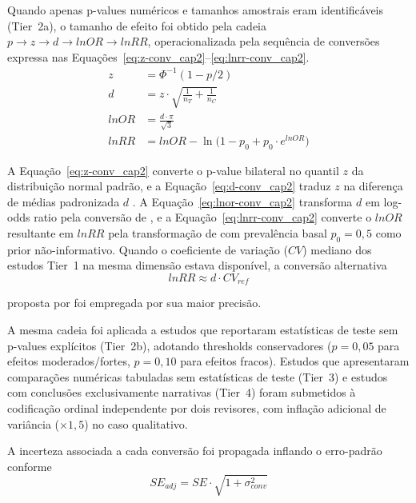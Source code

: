 Quando apenas p-values numéricos e tamanhos amostrais eram identificáveis (Tier~2a), o tamanho de efeito foi obtido pela cadeia $p \rightarrow z \rightarrow d \rightarrow lnOR \rightarrow lnRR$, operacionalizada pela sequência de conversões expressa nas Equações~\ref{eq:z-conv_cap2}--\ref{eq:lnrr-conv_cap2}.
%
\begin{align}
z &= \Phi^{-1}(1 - p/2) \label{eq:z-conv_cap2} \\
d &= z \cdot \sqrt{\frac{1}{n_T} + \frac{1}{n_C}} \label{eq:d-conv_cap2} \\
lnOR &= \frac{d \cdot \pi}{\sqrt{3}} \label{eq:lnor-conv_cap2} \\
lnRR &= lnOR - \ln\!\bigl(1 - p_0 + p_0 \cdot e^{lnOR}\bigr) \label{eq:lnrr-conv_cap2}
\end{align}

\noindent A Equação~\ref{eq:z-conv_cap2} converte o p-value bilateral no quantil $z$ da distribuição normal padrão, e a Equação~\ref{eq:d-conv_cap2} traduz $z$ na diferença de médias padronizada $d$ \cite{Borenstein2009}. A Equação~\ref{eq:lnor-conv_cap2} transforma $d$ em log-odds ratio pela conversão de , e a Equação~\ref{eq:lnrr-conv_cap2} converte o $lnOR$ resultante em $lnRR$ pela transformação de  com prevalência basal $p_0 = 0{,}5$ como prior não-informativo. Quando o coeficiente de variação ($CV$) mediano dos estudos Tier~1 na mesma dimensão estava disponível, a conversão alternativa
%
\begin{equation}
lnRR \approx d \cdot CV_{ref}
\label{eq:lnrr-cv_cap2}
\end{equation}

\noindent proposta por  foi empregada por sua maior precisão.

A mesma cadeia foi aplicada a estudos que reportaram estatísticas de teste sem p-values explícitos (Tier~2b), adotando thresholds conservadores ($p = 0{,}05$ para efeitos moderados/fortes, $p = 0{,}10$ para efeitos fracos). Estudos que apresentaram comparações numéricas tabuladas sem estatísticas de teste (Tier~3) e estudos com conclusões exclusivamente narrativas (Tier~4) foram submetidos à codificação ordinal independente por dois revisores, com inflação adicional de variância ($\times 1{,}5$) no caso qualitativo.

A incerteza associada a cada conversão foi propagada inflando o erro-padrão conforme
%
\begin{equation}
SE_{adj} = SE \cdot \sqrt{1 + \sigma^2_{conv}}
\label{eq:se-adj_cap2}
\end{equation}


